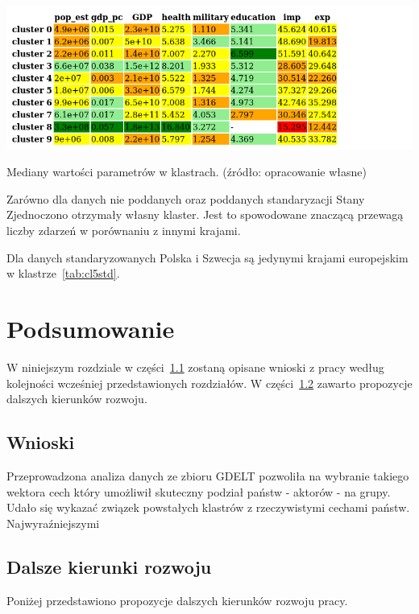 \documentclass[11pt]{report}
\begin{document}
    \begin{table}[!htp]
        \centering
        \includegraphics[width=\linewidth]{tables/CLUST/desc/cluster_median_summary.png}
        \caption{Mediany wartości parametrów w klastrach. (źródło: opracowanie własne)}
        \label{tab:cl_median_summ}
    \end{table}


    Zarówno dla danych nie poddanych oraz poddanych standaryzacji Stany Zjednoczono otrzymały własny klaster.
    Jest to spowodowane znaczącą przewagą liczby zdarzeń w porównaniu z innymi krajami.

    Dla danych standaryzowanych Polska i Szwecja są jedynymi krajami europejskim w klastrze~\ref{tab:cl5std}.


    \chapter{Podsumowanie}\label{ch:podsumowanie}
    W niniejszym rozdziale w części~\ref{sec:wnioski} zostaną opisane wnioski z pracy według kolejności wcześniej przedstawionych rozdziałów.
    W części~\ref{sec:dalsze-kierunki-rozwoju} zawarto propozycje dalszych kierunków rozwoju.


    \section{Wnioski}\label{sec:wnioski}
    Przeprowadzona analiza danych ze zbioru GDELT pozwoliła na wybranie takiego wektora cech który umożliwił skuteczny podział państw - aktorów - na grupy.
    Udało się wykazać związek powstałych klastrów z rzeczywistymi cechami państw.
    Najwyraźniejszymi


    \section{Dalsze kierunki rozwoju}\label{sec:dalsze-kierunki-rozwoju}
    Poniżej przedstawiono propozycje dalszych kierunków rozwoju pracy.
\end{document}
